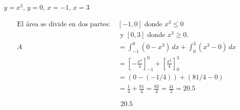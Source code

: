 $y=x^3$, $y=0$, $x=-1$, $x=3$

\nopagebreak
\begin{align*}
\text{El área se divide en dos partes: } & [-1,0] \text{ donde } x^3 \le 0 \\
& \text{ y } [0,3] \text{ donde } x^3 \ge 0. \\
A &= \int_{-1}^{0} (0 - x^3) \, dx + \int_{0}^{3} (x^3 - 0) \, dx \\
&= \left[ -\frac{x^4}{4} \right]_{-1}^{0} + \left[ \frac{x^4}{4} \right]_{0}^{3} \\
&= (0 - (-1/4)) + (81/4 - 0) \\
&= \frac{1}{4} + \frac{81}{4} = \frac{82}{4} = \frac{41}{2} = 20.5
\end{align*}

\[
\boxed{\displaystyle 20.5}
\]

